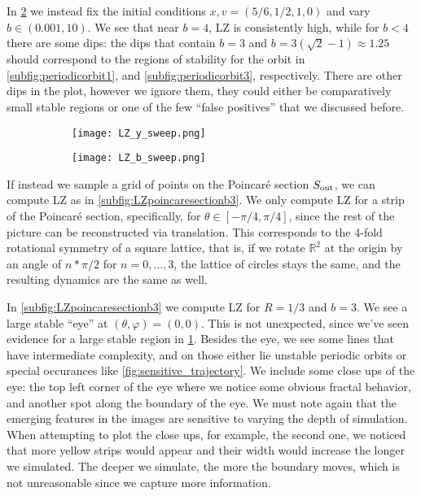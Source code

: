 In \cref{subfig:LZsweepb} we instead fix the initial conditions $x,v=(5/6,1/2,1,0)$ and vary $b\in(0.001,10)$. We see that near $b=4$, LZ is consistently high, while for $b<4$ there are some dips: the dips that contain $b=3$ and $b=3(\sqrt2-1)\approx1.25$ should correspond to the regions of stability for the orbit in \cref{subfig:periodicorbit1}, and \cref{subfig:periodicorbit3}, respectively. There are other dips in the plot, however we ignore them, they could either be comparatively small stable regions or one of the few ``false positives'' that we discussed before.

\begin{figure}[!th]
\centering
\begin{subfigure}[t]{0.49\textwidth}
\centering
\texttt{[image: LZ\_y\_sweep.png]}
\caption{}
\label{subfig:LZsweepY}
\end{subfigure}
%
\begin{subfigure}[t]{0.49\textwidth}
\centering
\texttt{[image: LZ\_b\_sweep.png]}
\caption{}
\label{subfig:LZsweepb}
\end{subfigure}
\caption{}
\label{fig:LZsweep1d}
\end{figure}


If instead we sample a grid of points on the Poincar\'e section $S_\text{out}$, we can compute LZ as in \cref{subfig:LZpoincaresectionb3}. We only compute LZ for a strip of the Poincar\'e section, specifically, for $\theta\in[-\pi/4,\pi/4]$, since the rest of the picture can be reconstructed via translation. This corresponds to the 4-fold rotational symmetry of a square lattice, that is, if we rotate $\mathbb R^2$ at the origin by an angle of $n*\pi/2$ for $n=0,\dots, 3$, the lattice of circles stays the same, and the resulting dynamics are the same as well.

In \cref{subfig:LZpoincaresectionb3} we compute LZ for $R=1/3$ and $b=3$. We see a large stable ``eye'' at $(\theta, \varphi)=(0,0)$. This is not unexpected, since we've seen evidence for a large stable region in \cref{subfig:LZsweepY}. Besides the eye, we see some lines that have intermediate complexity, and on those either lie unstable periodic orbits or special occurances like \cref{fig:sensitive_trajectory}. We include some close ups of the eye: the top left corner of the eye where we notice some obvious fractal behavior, and another spot along the boundary of the eye. We must note again that the emerging features in the images are sensitive to varying the depth of simulation. When attempting to plot the close ups, for example, the second one, we noticed that more yellow strips would appear and their width would increase the longer we simulated. The deeper we simulate, the more the boundary moves, which is not unreasonable since we capture more information.

